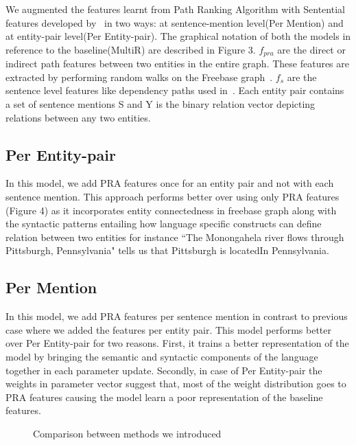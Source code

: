 \documentclass[11pt,a4paper]{article}
\begin{document}
We augmented the features learnt from Path Ranking Algorithm with Sentential
features developed by~\cite{riedel-2010-distant-supervision} in two ways: at
sentence-mention level(Per Mention) and at entity-pair level(Per Entity-pair).
The graphical notation of both the models in reference to the baseline(MultiR)
are described in Figure 3. $f_{pra}$ are the direct or indirect path features
between two entities in the entire graph. These features are extracted by
performing random walks on the Freebase graph~\cite{lao-2011-pra2}. $f_{s}$ are
the sentence level features like dependency paths used
in~\cite{riedel-2010-distant-supervision,hoffmann-2011-distant-supervision,surdeanu-2012-relation-extraction}.
Each entity pair contains a set of sentence mentions S and Y is the binary
relation vector depicting relations between any two entities.


\subsection{Per Entity-pair}

In this model, we add PRA features once for an entity pair and not with each
sentence mention. This approach performs better over using only PRA features
(Figure 4) as it incorporates entity connectedness in freebase graph along with
the syntactic patterns entailing how language specific constructs can define
relation between two entities for instance ``The Monongahela river flows
through Pittsburgh, Pennsylvania" tells us that Pittsburgh is locatedIn
Pennsylvania.

\subsection{Per Mention}

In this model, we add PRA features per sentence mention in contrast to previous
case where we added the features per entity pair. This model performs better
over Per Entity-pair for two reasons.  First, it trains a better representation
of the model by bringing the semantic and syntactic components of the language
together in each parameter update. Secondly, in case of Per Entity-pair the
weights in parameter vector suggest that, most of the weight distribution goes
to PRA features causing the model learn a poor representation of the baseline
features.

\begin{figure}
  \centering
  \caption{Comparison between methods we introduced}
\end{figure}
\end{document}

